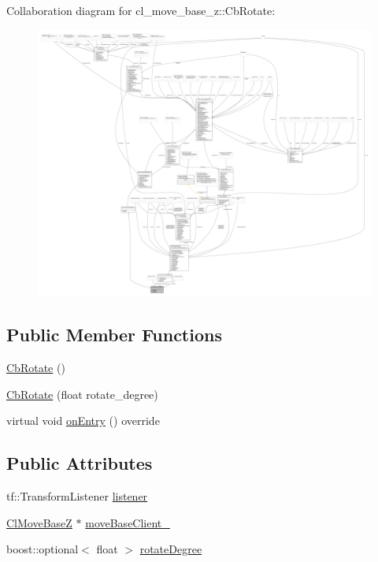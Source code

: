 Collaboration diagram for cl\+\_\+move\+\_\+base\+\_\+z\+:\+:Cb\+Rotate\+:
\nopagebreak
\begin{figure}[H]
\begin{center}
\leavevmode
\includegraphics[width=350pt]{classcl__move__base__z_1_1CbRotate__coll__graph}
\end{center}
\end{figure}
\subsection*{Public Member Functions}
\begin{DoxyCompactItemize}
\item 
\hyperlink{classcl__move__base__z_1_1CbRotate_a00dc68fbc8e72461f338de1cbdfceffd}{Cb\+Rotate} ()
\item 
\hyperlink{classcl__move__base__z_1_1CbRotate_ac5b1f8c358d719d2cdc8417f65143ad8}{Cb\+Rotate} (float rotate\+\_\+degree)
\item 
virtual void \hyperlink{classcl__move__base__z_1_1CbRotate_a316ee51ecfd3f10fd1edae0d7d3b26c0}{on\+Entry} () override
\end{DoxyCompactItemize}
\subsection*{Public Attributes}
\begin{DoxyCompactItemize}
\item 
tf\+::\+Transform\+Listener \hyperlink{classcl__move__base__z_1_1CbRotate_a2b57c5f392fde0a3bf38f5fd6e1bde11}{listener}
\item 
\hyperlink{classcl__move__base__z_1_1ClMoveBaseZ}{Cl\+Move\+BaseZ} $\ast$ \hyperlink{classcl__move__base__z_1_1CbRotate_a390623f5bcbdad18fe2a65428e4621cb}{move\+Base\+Client\+\_\+}
\item 
boost\+::optional$<$ float $>$ \hyperlink{classcl__move__base__z_1_1CbRotate_a83e9f97e917044f919c98a55d8e00db6}{rotate\+Degree}
\end{DoxyCompactItemize}

